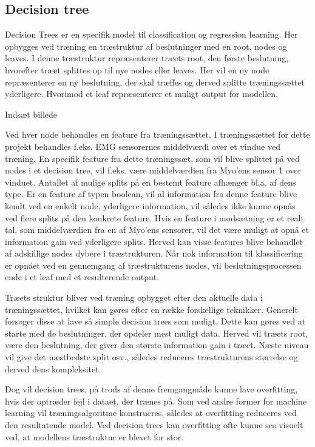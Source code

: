 \subsection{Decision tree}
Decision Trees er en specifik model til classification og regression learning. Her opbygges ved træning en træstruktur af beslutninger med en root, nodes og leaves. I denne træstruktur repræsenterer træets root, den første beslutning, hvorefter træet splittes op til nye nodes eller leaves. Her vil en ny node repræsenterer en ny beslutning, der skal træffes og derved splitte træningssættet yderligere. Hvorimod et leaf repræsenterer et muligt output for modellen. 

Indsæt billede

Ved hver node behandles en feature fra træningssættet. I træningssættet for dette projekt behandles f.eks. EMG sensorernes middelværdi over et vindue ved træning. En specifik feature fra dette træningssæt, som vil blive splittet på ved nodes i et decision tree, vil f.eks. være middelværdien fra Myo’ens sensor 1 over vinduet. 
Antallet af mulige splits på en bestemt feature afhænger bl.a. af dens type. Er en feature af typen boolean, vil al information fra denne feature blive kendt ved en enkelt node, yderligere information, vil således ikke kunne opnås ved flere splits på den konkrete feature. Hvis en feature i modsætning er et realt tal, som middelværdien fra en af Myo’ens sensorer, vil det være muligt at opnå et information gain ved yderligere splits. Herved kan visse features blive behandlet af adskillige nodes dybere i træstrukturen.
Når nok information til klassificering er opnået ved en gennemgang af træstrukturens nodes, vil beslutningsprocessen ende i et leaf med et resulterende output. 

Træets struktur bliver ved træning opbygget efter den aktuelle data i træningssættet, hvilket kan gøres efter en række forskellige teknikker. Generelt forsøger disse at lave så simple decision trees som muligt. Dette kan gøres ved at starte med de beslutninger, der opdeler mest muligt data. Herved vil træets root, være den beslutning, der giver den største information gain i træet. Næste niveau vil give det næstbedste split osv., således reduceres træstrukturens størrelse og derved dens kompleksitet. 

Dog vil decision trees, på trods af denne fremgangmåde kunne lave overfitting, hvis der optræder fejl i dataet, der trænes på. Som ved andre former for machine learning vil træningsalgoritme konstrueres, således at overfitting reduceres ved den resultatende model. Ved decision trees kan overfitting ofte kunne ses visuelt ved, at modellens træstruktur er blevet for stor. 

